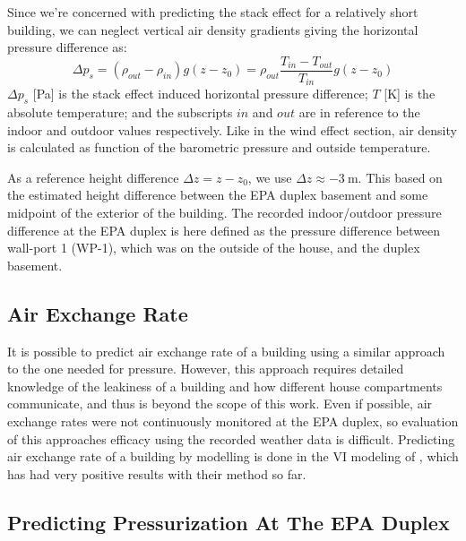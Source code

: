 Since we're concerned with predicting the stack effect for a relatively short building, we can neglect vertical air density gradients giving the horizontal pressure difference as:
\begin{equation}
  \Delta p_s = (\rho_{out} - \rho_{in}) g (z - z_0) = \rho_{out} \frac{T_{in} - T_{out}}{T_{in}} g (z - z_0)
\end{equation}
$\Delta p_s$ [\si{\pascal}] is the stack effect induced horizontal pressure difference;
$T$ [\si{\kelvin}] is the absolute temperature;
and the subscripts $in$ and $out$ are in reference to the indoor and outdoor values respectively.
Like in the wind effect section, air density is calculated as function of the barometric pressure and outside temperature.\par

As a reference height difference $\Delta z = z - z_0$, we use $\Delta z \approx \SI{-3}{\metre}$.
This based on the estimated height difference between the EPA duplex basement and some midpoint of the exterior of the building.
The recorded indoor/outdoor pressure difference at the EPA duplex is here defined as the pressure difference between wall-port 1 (WP-1), which was on the outside of the house, and the duplex basement.\par

\subsection{Air Exchange Rate}

It is possible to predict air exchange rate of a building using a similar approach to the one needed for pressure.
However, this approach requires detailed knowledge of the leakiness of a building and how different house compartments communicate, and thus is beyond the scope of this work.
Even if possible, air exchange rates were not continuously monitored at the EPA duplex, so evaluation of this approaches efficacy using the recorded weather data is difficult.
Predicting air exchange rate of a building by modelling is done in the VI modeling of \citeauthor{shirazi_three-dimensional_2017}\cite{shirazi_three-dimensional_2017}, which has had very positive results with their method so far.\par

\subsection{Predicting Pressurization At The EPA Duplex}

